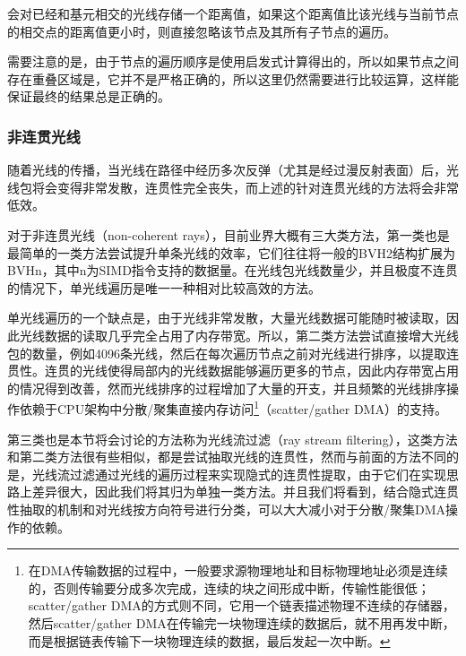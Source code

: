\cite{a:EfficientRayTracingKernelsforModernCPUArchitectures}会对已经和基元相交的光线存储一个距离值，如果这个距离值比该光线与当前节点的相交点的距离值更小时，则直接忽略该节点及其所有子节点的遍历。

需要注意的是，由于节点的遍历顺序是使用启发式计算得出的，所以如果节点之间存在重叠区域是，它并不是严格正确的，所以这里仍然需要进行比较运算，这样能保证最终的结果总是正确的。







\subsubsection{非连贯光线}
随着光线的传播，当光线在路径中经历多次反弹（尤其是经过漫反射表面）后，光线包将会变得非常发散，连贯性完全丧失，而上述的针对连贯光线的方法将会非常低效。

对于非连贯光线（non-coherent rays），目前业界大概有三大类方法，第一类也是最简单的一类方法尝试提升单条光线的效率，它们往往将一般的BVH2结构扩展为BVHn，其中n为SIMD指令支持的数据量。在光线包光线数量少，并且极度不连贯的情况下，单光线遍历是唯一一种相对比较高效的方法。

单光线遍历的一个缺点是，由于光线非常发散，大量光线数据可能随时被读取，因此光线数据的读取几乎完全占用了内存带宽。所以，第二类方法尝试直接增大光线包的数量，例如4096条光线，然后在每次遍历节点之前对光线进行排序，以提取连贯性。连贯的光线使得局部内的光线数据能够遍历更多的节点，因此内存带宽占用的情况得到改善，然而光线排序的过程增加了大量的开支，并且频繁的光线排序操作依赖于CPU架构中分散/聚集直接内存访问\footnote{在DMA传输数据的过程中，一般要求源物理地址和目标物理地址必须是连续的，否则传输要分成多次完成，连续的块之间形成中断，传输性能很低；scatter/gather DMA的方式则不同，它用一个链表描述物理不连续的存储器，然后scatter/gather DMA在传输完一块物理连续的数据后，就不用再发中断，而是根据链表传输下一块物理连续的数据，最后发起一次中断。}（scatter/gather DMA）的支持。

第三类也是本节将会讨论的方法称为光线流过滤（ray stream filtering）\cite{a:DynamicRayStreamTraversal,a:EfficientRayTracingKernelsforModernCPUArchitectures}，这类方法和第二类方法很有些相似，都是尝试抽取光线的连贯性，然而与前面的方法不同的是，光线流过滤通过光线的遍历过程来实现隐式的连贯性提取，由于它们在实现思路上差异很大，因此我们将其归为单独一类方法。并且我们将看到，结合隐式连贯性抽取的机制和对光线按方向符号进行分类，可以大大减小对于分散/聚集DMA操作的依赖。







